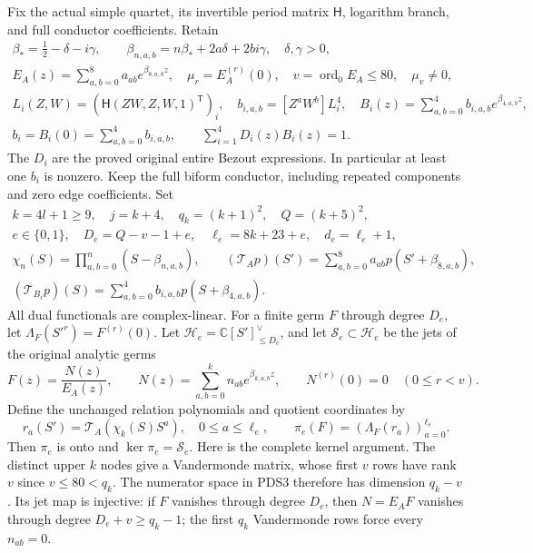 \documentclass[10pt]{article}
\begin{document}
Fix the actual simple quartet, its invertible period matrix $\mathsf H$,
logarithm branch, and full conductor coefficients. Retain
\[
\begin{gathered}
 \beta_*={\tfrac12}-\delta-i\gamma,\qquad
 \beta_{n,a,b}=n\beta_*+2a\delta+2bi\gamma,\quad\delta,\gamma>0,\\
 E_A(z)=\sum_{a,b=0}^8a_{ab}e^{\beta_{8,a,b}z},\quad
 \mu_r=E_A^{(r)}(0),\quad
 v=\operatorname{ord}_0E_A\le80,\quad\mu_v\ne0,\\
 L_i(Z,W)=(\mathsf H(ZW,Z,W,1)^{\mathsf T})_i,\quad
 b_{i,a,b}=[Z^aW^b]L_i^4,\quad
 B_i(z)=\sum_{a,b=0}^4b_{i,a,b}e^{\beta_{4,a,b}z},\\
 b_i=B_i(0)=\sum_{a,b=0}^4b_{i,a,b},\qquad
 \sum_{i=1}^4D_i(z)B_i(z)=1 .
\end{gathered}\tag{PDS1}
\]
The $D_i$ are the proved original entire Bezout expressions. In
particular at least one $b_i$ is nonzero. Keep the full biform conductor,
including repeated components and zero edge coefficients. Set
\[
\begin{gathered}
 k=4l+1\ge9,\quad j=k+4,\quad q_k=(k+1)^2,\quad Q=(k+5)^2,\\
 e\in\{0,1\},\quad D_e=Q-v-1+e,\quad
 \ell_e=8k+23+e,\quad d_e=\ell_e+1,\\
 \chi_n(S)=\prod_{a,b=0}^n(S-\beta_{n,a,b}),\qquad
 (\mathcal T_Ap)(S')=\sum_{a,b=0}^8a_{ab}p(S'+\beta_{8,a,b}),\\
 (\mathcal T_{B_i}p)(S)=
       \sum_{a,b=0}^4b_{i,a,b}p(S+\beta_{4,a,b}).
\end{gathered}\tag{PDS2}
\]
All dual functionals are complex-linear. For a finite germ $F$ through
degree $D_e$, let $\Lambda_F(S'^r)=F^{(r)}(0)$.
Let $\mathcal H_e=\mathbb C[S']_{\le D_e}^{\vee}$, and let
$\mathcal S_e\subset\mathcal H_e$ be the jets of the original analytic
germs
\[
 F(z)=\frac{N(z)}{E_A(z)},\qquad
 N(z)=\sum_{a,b=0}^k n_{ab}e^{\beta_{k,a,b}z},\qquad
 N^{(r)}(0)=0\quad(0\le r<v).
\tag{PDS3}
\]
Define the unchanged relation polynomials and quotient coordinates by
\[
 r_a(S')=\mathcal T_A(\chi_k(S)S^a),\quad0\le a\le\ell_e,
 \qquad \pi_e(F)=(\Lambda_F(r_a))_{a=0}^{\ell_e}.
\tag{PDS4}
\]
Then $\pi_e$ is onto and $\ker\pi_e=\mathcal S_e$.
Here is the complete kernel argument. The distinct upper $k$ nodes give
a Vandermonde matrix, whose first $v$ rows have rank $v$ since
$v\le80<q_k$. The numerator space in PDS3 therefore has dimension
$q_k-v$. Its jet map is injective: if $F$ vanishes through degree
$D_e$, then $N=E_AF$ vanishes through degree $D_e+v\ge q_k-1$;
the first $q_k$ Vandermonde rows force every $n_{ab}=0$.
\end{document}
